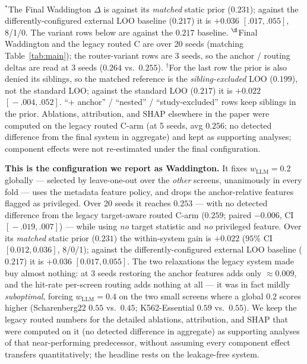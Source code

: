 \documentclass[11pt]{article}
\begin{document}
\begin{table}[H]
\begin{tabular}{lccc}
\bottomrule
\end{tabular}\\[2pt]
{\footnotesize $^{*}$The Final Waddington $\Delta$ is against its \emph{matched} static prior ($0.231$);
against the differently-configured external LOO baseline ($0.217$) it is $+0.036$ {\tiny$[.017,.055]$},
8/1/0. The variant rows below are against the $0.217$ baseline.
$^{\S}$Final Waddington and the legacy routed C are over 20 seeds (matching Table~\ref{tab:main}); the router-variant rows are 3
seeds, so the anchor / routing deltas are read at 3 seeds ($0.264$ vs.\ $0.255$).
$^{\dagger}$For the last row the prior is also denied its siblings, so the matched reference is the
\emph{sibling-excluded} LOO ($0.199$), not the standard LOO; against the standard LOO ($0.217$) it is
$+0.022$ {\tiny$[\!-\!.004,.052]$}. ``$+$ anchor'' / ``nested'' / ``study-excluded'' rows keep siblings in
the prior. Ablations, attribution, and SHAP elsewhere in the paper were computed on the legacy routed
C-arm (at 5 seeds, avg $0.256$; no detected difference from the final system in aggregate) and kept as
supporting analyses; component effects were not re-estimated under the final configuration.}
\end{table}

\noindent
\textbf{This is the configuration we report as Waddington.} It fixes $w_{\mathrm{LLM}}=0.2$ globally ---
selected by leave-one-out over the \emph{other} screens, unanimously in every fold --- uses the metadata
feature policy, and drops the anchor-relative features flagged as privileged. Over 20 seeds it reaches
$0.253$ --- with no detected difference from the legacy target-aware routed C-arm ($0.259$; paired
$-0.006$, CI $[\!-\!.019,.007]$) --- while using \emph{no} target statistic and \emph{no} privileged
feature. Over its \emph{matched} static prior ($0.231$) the within-system gain is $+0.022$ ($95\%$ CI
$[0.012,0.036]$, 8/0/1); against the differently-configured external LOO baseline ($0.217$) it is $+0.036$
$[0.017,0.055]$. The two relaxations the legacy system
made buy almost nothing: at 3 seeds restoring the anchor features adds only $\approx\!0.009$, and the
hit-rate per-screen routing adds nothing at all --- it was in fact mildly \emph{suboptimal}, forcing
$w_{\mathrm{LLM}}=0.4$ on the two small screens where a global $0.2$ scores higher (Scharenberg22 $0.55$
vs.\ $0.45$; K562-Essential $0.59$ vs.\ $0.55$). We keep the legacy routed numbers for the detailed
ablations, attribution, and SHAP that were computed on it (no detected difference in aggregate) as
supporting analyses of that near-performing predecessor, without assuming every component effect transfers
quantitatively; the headline rests on the leakage-free system.
\end{document}
